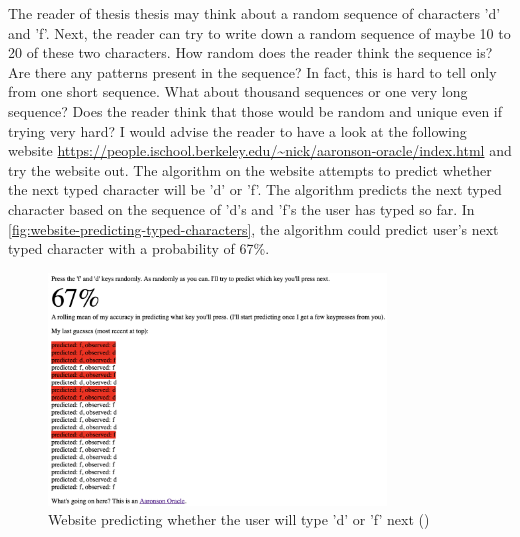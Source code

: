 \documentclass{BachelorBUI}
\begin{document}
        The reader of thesis thesis may think about a random sequence of characters 'd' and 'f'. Next, the reader can try to write down a random sequence of maybe 10 to 20 of these two characters. How random does the reader think the sequence is? Are there any patterns present in the sequence? In fact, this is hard to tell only from one short sequence. What about thousand sequences or one very long sequence? Does the reader think that those would be random and unique even if trying very hard? I would advise the reader to have a look at the following website \url{https://people.ischool.berkeley.edu/~nick/aaronson-oracle/index.html} and try the website out. The algorithm on the website attempts to predict whether the next typed character will be 'd' or 'f'. The algorithm predicts the next typed character based on the sequence of 'd's and 'f's the user has typed so far. In \autoref{fig:website-predicting-typed-characters}, the algorithm could predict user's next typed character with a probability of 67\%. 

        \begin{figure}[h]
            \centering
            \includegraphics[width=0.8\textwidth]{website_predicting_typed_characters.png}
            \caption{Website predicting whether the user will type 'd' or 'f' next (\cite{website_predicting_typed_characters:2024})}
            \label{fig:website-predicting-typed-characters}
        \end{figure}
\end{document}
